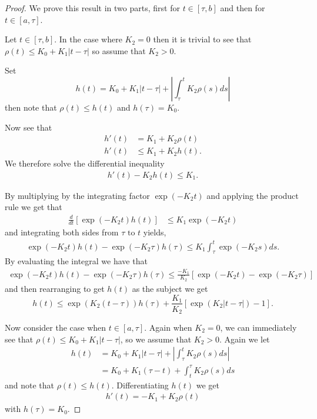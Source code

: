 \documentclass{unswmaths}
\begin{document}
\begin{proof}
We prove this result in two parts, first for $ t \in [ \tau, b ] $ and then
for $ t \in [ a, \tau ] $. 

Let $ t \in [\tau, b] $. In the case where $ K_2 = 0 $ then it is trivial to see 
that $ \rho(t) \leq K_0 + K_1|t - \tau| $ so assume that $ K_2 > 0 $. 

Set $$ h(t) = K_0 + K_1|t - \tau| + | \int_\tau^t K_2 \rho(s) ds | $$ then note
that $ \rho(t) \leq h(t) $ and $ h(\tau) = K_0 $. 

Now see that
\begin{align*} 
	h'(t) &= K_1 + K_2\rho(t)  \\
	h'(t) &\leq K_1 + K_2h(t).
\end{align*}
We therefore solve the differential inequality
\begin{align*}
	h'(t) - K_2h(t) \leq K_1. 
\end{align*}

By multiplying by the integrating factor $ \exp(-K_2 t) $ and applying the 
product rule we get that 
\begin{align*}
	\frac{d}{dt} \left[ \exp(-K_2t)h(t) \right] &\leq K_1\exp(-K_2t)
\end{align*}
and integrating both sides from $ \tau \text{ to } t $ yields, 
\begin{align*}
	\exp(-K_2t)h(t) - \exp(-K_2\tau)h(\tau) \leq K_1 \int_\tau^t \exp(-K_2s)ds.
\end{align*}
By evaluating the integral we have that 
\begin{align*}
	\exp(-K_2t)h(t) - \exp(-K_2\tau)h(\tau) \leq \frac{-K_1}{K_2}\left[ \exp(-K_2t) - \exp(-K_2\tau) \right]
\end{align*}
and then rearranging to get $ h(t) $ as the subject we get
\begin{equation}
	\label{eq:Gronwell_Bellman_1}
	h(t) \leq \exp(K_2(t-\tau))h(\tau) + \frac{K_1}{K_2}\left[\exp(K_2|t-\tau|) - 1\right].
\end{equation}

Now consider the case when $ t \in [a, \tau] $.
Again when $ K_2 = 0 $, we can immediately see that $ \rho(t) \leq K_0 + K_1|t - \tau| $, 
so we assume that $ K_2 > 0 $. 
Again we let 
\begin{align*}
	h(t) 	&= K_0 + K_1|t - \tau| + |\int_\tau^t K_2 \rho(s) ds | \\
	     	&= K_0 + K_1(\tau - t) + \int_t^\tau K_2\rho(s) ds
\end{align*}
and note that $ \rho(t) \leq h(t) $. Differentiating $ h(t) $ we get
\begin{align*}
	h'(t) = -K_1 +K_2\rho(t)
\end{align*}
with $ h(\tau) = K_0 $.


\end{proof}
\end{document}
